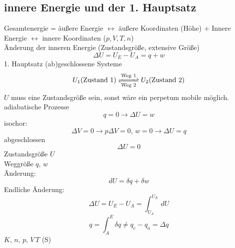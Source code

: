 \documentclass[a4paper, fleqn]{article}
\begin{document}
\subsection[innere Energie 1.HS]{innere Energie und der 1. Hauptsatz}
Gesamtenergie = äußere Energie $\leftrightarrow$ äußere Koordinaten (Höhe) + Innere Energie $\leftrightarrow$ innere Koordinaten ($p,V,T,n$)\\
Änderung der inneren Energie (Zustandsgröße, extensive Größe)
\begin{equation*}
    \Delta U = U_E - U_A = q + w
\end{equation*}
1. Hauptsatz (ab)geschlossene Systeme\\
\begin{equation*}
    U_1 (\text{Zustand 1}) \ce{<=>[{Weg 1}][{Weg 2}]} U_2 (\text{Zustand 2}) 
\end{equation*}
$U$ muss eine Zustandsgröße sein, sonst wäre ein perpetum mobile möglich.\\
adiabatische Prozesse
\begin{equation*}
    q = 0 \rightarrow \Delta U = w
\end{equation*}
isochor:
\begin{equation*}
    \Delta V = 0 \rightarrow p\Delta V = 0, \, w = 0 \rightarrow \Delta U = q
\end{equation*}
abgeschlossen
\begin{equation*}
    \Delta U = 0
\end{equation*}
Zustandsgröße $U$\\
Weggröße $q,\,w$\\
Änderung:
\begin{equation*}
    dU = \delta q + \delta w
\end{equation*}
Endliche Änderung:
\begin{equation*}
    \Delta U = U_E - U_A = \int_{U_A}^{U_E} \,dU
\end{equation*}
\begin{equation*}
    q=\int_{A}^{E} \delta q \neq q_e - q_a = \Delta q
\end{equation*}
$K,\,n,\,p,\,V\,T$ (S)
\end{document}
